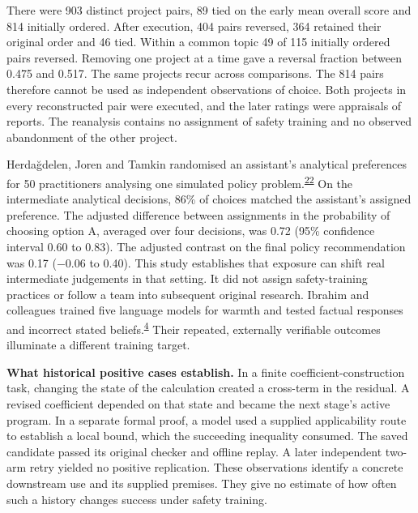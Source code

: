 \documentclass[11pt,a4paper]{article}
\newcommand{\lead}[1]{\textbf{#1}\enspace}
\newcommand{\articlecite}[2]{\textsuperscript{\href{#2}{#1}}}
\begin{document}
There were 903 distinct project pairs, 89 tied on the early mean overall score and 814 initially ordered. After execution, 404 pairs reversed, 364 retained their original order and 46 tied. Within a common topic 49 of 115 initially ordered pairs reversed. Removing one project at a time gave a reversal fraction between 0.475 and 0.517. The same projects recur across comparisons. The 814 pairs therefore cannot be used as independent observations of choice. Both projects in every reconstructed pair were executed, and the later ratings were appraisals of reports. The reanalysis contains no assignment of safety training and no observed abandonment of the other project.

Herda\u{g}delen, Joren and Tamkin randomised an assistant's analytical preferences for 50 practitioners analysing one simulated policy problem.\articlecite{22}{https://assets.claude.com/519c17a5d23a794e8b6d50a854048d0b61e0d73a.pdf} On the intermediate analytical decisions, 86\% of choices matched the assistant's assigned preference. The adjusted difference between assignments in the probability of choosing option A, averaged over four decisions, was 0.72 (95\% confidence interval 0.60 to 0.83). The adjusted contrast on the final policy recommendation was 0.17 ($-0.06$ to 0.40). This study establishes that exposure can shift real intermediate judgements in that setting. It did not assign safety-training practices or follow a team into subsequent original research. Ibrahim and colleagues trained five language models for warmth and tested factual responses and incorrect stated beliefs.\articlecite{4}{https://doi.org/10.1038/s41586-026-10410-0} Their repeated, externally verifiable outcomes illuminate a different training target.

\lead{What historical positive cases establish.} In a finite coefficient-construction task, changing the state of the calculation created a cross-term in the residual. A revised coefficient depended on that state and became the next stage's active program. In a separate formal proof, a model used a supplied applicability route to establish a local bound, which the succeeding inequality consumed. The saved candidate passed its original checker and offline replay. A later independent two-arm retry yielded no positive replication. These observations identify a concrete downstream use and its supplied premises. They give no estimate of how often such a history changes success under safety training.\cite{chen}
\end{document}
